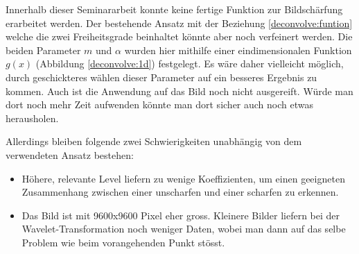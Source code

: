 Innerhalb dieser Seminararbeit konnte keine fertige Funktion zur Bildschärfung erarbeitet werden.
Der bestehende Ansatz mit der Beziehung \eqref{deconvolve:funtion} welche die zwei Freiheitsgrade beinhaltet könnte aber noch verfeinert werden.
Die beiden Parameter $m$ und $\alpha$ wurden hier mithilfe einer eindimensionalen Funktion $g(x)$ (Abbildung \ref{deconvolve:1d}) festgelegt.
Es wäre daher vielleicht möglich, durch geschickteres wählen dieser Parameter auf ein besseres Ergebnis zu kommen.
Auch ist die Anwendung auf das Bild noch nicht ausgereift.
Würde man dort noch mehr Zeit aufwenden könnte man dort sicher auch noch etwas herausholen.

Allerdings bleiben folgende zwei Schwierigkeiten unabhängig von dem verwendeten Ansatz bestehen:
\begin{itemize}
	\item Höhere, relevante Level liefern zu wenige Koeffizienten, um einen geeigneten Zusammenhang zwischen einer unscharfen und einer scharfen zu erkennen.
	\item Das Bild ist mit 9600x9600 Pixel eher gross. Kleinere Bilder liefern bei der Wavelet-Transformation noch weniger Daten, wobei man dann auf das selbe Problem wie beim vorangehenden Punkt stösst.
\end{itemize}
